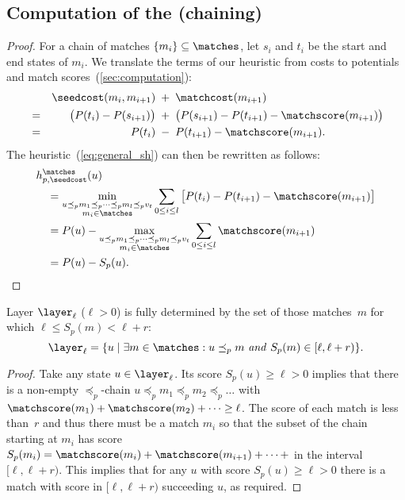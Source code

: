 \subsection{Computation of the (chaining) \sh}\label{app:computation}

\thmcomputation*

\begin{proof}
For a chain of matches $\{m_i\} \subseteq \matches$, let $s_i$ and $t_i$ be the
start and end states of $m_i$. We translate the terms of our heuristic from
costs to potentials and match
scores~(\cref{sec:computation}):
\begin{align*}
  && \seedcost(m_i, m_{i+1}) \; &+ \; \matchcost(m_{i+1})\\
  &=& \big(P(t_i) - P(s_{i+1})\big) \; &+ \; \big(P(s_{i+1}) - P(t_{i+1}) - \matchscore(m_{i+1})\big)\\
  &=& P(t_i)\; &-\; P(t_{i+1}) - \matchscore(m_{i+1}).
\end{align*}
The heuristic~(\cref{eq:general_sh}) can then be rewritten as follows:
\begin{align*}
  &h^\matches_{p,\seedcost}(u)\nonumber\\
  &\quad= \min_{
          \substack{
            u \preceq_p m_1 \preceq_p \dots \preceq_p m_l \preceq_p v_t\\
            m_i \in \matches}
        }
        \sum_{0\leq i \leq l}
          \big[ P(t_i) - P(t_{i+1}) - \matchscore(m_{i+1}) \big]\nonumber\\
  &\quad= P(u) - \max_{
          \substack{
            u \preceq_p m_1 \preceq_p \dots \preceq_p m_l \preceq_p v_t\\
            m_i \in \matches}
        }
        \sum_{0\leq i \leq l}
          \matchscore(m_{i+1})\nonumber\\
      &\quad= P(u) - S_p(u).
      \qedhere
\end{align*}
\end{proof}

\begin{lem}\label{lem:contour}
  Layer $\layer_\ell$ ($\ell>0$) is fully determined by the set of those matches~$m$
  for which $\ell \leq S_p(m) < \ell+r$:
  \begin{equation*}
    \layer_\ell = \{u \mid \exists m\in \matches : u \preceq_p m \text{ \emph{and} } S_p(m) \in [\ell,\ell+r)\}.
  \end{equation*}
\end{lem}

\begin{proof}\label{lem:contour-proof}
Take any state $u \in \layer_\ell$. Its score $S_p(u) \geq \ell > 0$ implies
that there is a non-empty \mbox{$\preceq_p$-chain}
${u\preceq_p m_1 \preceq_p m_2\preceq_p \dots}$ with
$\matchscore(m_1)+\matchscore(m_2) + \dots \geq \ell$.  The score of each match
is less than~$r$ and thus there must be a match $m_i$ so that the subset of the
chain starting at $m_i$ has score
$S_p(m_i) = \matchscore(m_i) + \matchscore(m_{i{+}1}) + \dots +$ in the
interval~$[\ell, \ell+r)$. This implies that for any $u$ with score
$S_p(u)\geq \ell > 0$ there is a match with score in $[\ell, \ell+r)$ succeeding
$u$, as required.
\end{proof}
